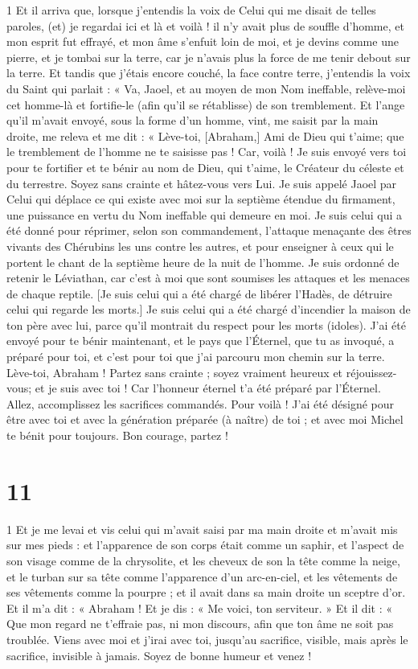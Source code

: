 \par 1 Et il arriva que, lorsque j'entendis la voix de Celui qui me disait de telles paroles, (et) je regardai ici et là et voilà ! il n'y avait plus de souffle d'homme, et mon esprit fut effrayé, et mon âme s'enfuit loin de moi, et je devins comme une pierre, et je tombai sur la terre, car je n'avais plus la force de me tenir debout sur la terre. Et tandis que j'étais encore couché, la face contre terre, j'entendis la voix du Saint qui parlait : « Va, Jaoel, et au moyen de mon Nom ineffable, relève-moi cet homme-là et fortifie-le (afin qu'il se rétablisse) de son tremblement. Et l'ange qu'il m'avait envoyé, sous la forme d'un homme, vint, me saisit par la main droite, me releva et me dit : « Lève-toi, [Abraham,] Ami de Dieu qui t'aime; que le tremblement de l'homme ne te saisisse pas ! Car, voilà ! Je suis envoyé vers toi pour te fortifier et te bénir au nom de Dieu, qui t'aime, le Créateur du céleste et du terrestre. Soyez sans crainte et hâtez-vous vers Lui. Je suis appelé Jaoel par Celui qui déplace ce qui existe avec moi sur la septième étendue du firmament, une puissance en vertu du Nom ineffable qui demeure en moi. Je suis celui qui a été donné pour réprimer, selon son commandement, l'attaque menaçante des êtres vivants des Chérubins les uns contre les autres, et pour enseigner à ceux qui le portent le chant de la septième heure de la nuit de l'homme. Je suis ordonné de retenir le Léviathan, car c'est à moi que sont soumises les attaques et les menaces de chaque reptile. [Je suis celui qui a été chargé de libérer l'Hadès, de détruire celui qui regarde les morts.] Je suis celui qui a été chargé d'incendier la maison de ton père avec lui, parce qu'il montrait du respect pour les morts (idoles). J'ai été envoyé pour te bénir maintenant, et le pays que l'Éternel, que tu as invoqué, a préparé pour toi, et c'est pour toi que j'ai parcouru mon chemin sur la terre. Lève-toi, Abraham ! Partez sans crainte ; soyez vraiment heureux et réjouissez-vous; et je suis avec toi ! Car l’honneur éternel t’a été préparé par l’Éternel. Allez, accomplissez les sacrifices commandés. Pour voilà ! J'ai été désigné pour être avec toi et avec la génération préparée (à naître) de toi ; et avec moi Michel te bénit pour toujours. Bon courage, partez !

\chapter{11}

\par 1 Et je me levai et vis celui qui m'avait saisi par ma main droite et m'avait mis sur mes pieds : et l'apparence de son corps était comme un saphir, et l'aspect de son visage comme de la chrysolite, et les cheveux de son la tête comme la neige, et le turban sur sa tête comme l'apparence d'un arc-en-ciel, et les vêtements de ses vêtements comme la pourpre ; et il avait dans sa main droite un sceptre d'or. Et il m'a dit : « Abraham ! Et je dis : « Me voici, ton serviteur. » Et il dit : « Que mon regard ne t’effraie pas, ni mon discours, afin que ton âme ne soit pas troublée. Viens avec moi et j'irai avec toi, jusqu'au sacrifice, visible, mais après le sacrifice, invisible à jamais. Soyez de bonne humeur et venez !

